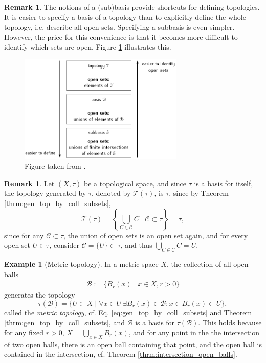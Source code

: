 \documentclass[12pt, a4paper]{article}
\numberwithin{equation}{section}
\theoremstyle{definition}
\theoremstyle{definition}
\newtheorem{exmp}[thm]{Example} %
\newtheorem{remark}[thm]{Remark} %
\begin{document}
		\begin{remark}
			The notions of a (sub)basis provide shortcuts for defining topologies. It is easier to specify a basis of a topology than to explicitly define the whole topology, i.e. describe all open sets. Specifying a subbasis is even simpler. However, the price for this convenience is that it becomes more difficult to identify which sets are open. Figure \ref{fig:topology_sub_basis} illustrates this.
			\begin{figure}[h!]
				\centering 
				\includegraphics[width=0.7\textwidth]{Figures/topoly_(sub)basis.pdf}
				\caption{Figure taken from \cite{src:topology_sub_basis}.}
				\label{fig:topology_sub_basis}
			\end{figure}
		\end{remark}
		
		\begin{remark}\label{remark:topology_generated_by_topology}
			Let $(X, \tau)$ be a topological space, and since $\tau$ is a basis for itself, the topology generated by $\tau$, denoted by $\mathscr T(\tau)$, is $\tau$, since by Theorem \ref{thrm:gen_top_by_coll_subsets},
			$$\mathscr T(\tau) = \left\{ \bigcup_{C\in\mathscr C}C \mid \mathscr C \subset \tau \right\} = \tau,$$ since for any $\mathscr C\subset\tau$, the union of open sets is an open set again, and for every open set $U\in\tau$, consider $\mathscr C = \{U\}\subset \tau$, and thus $\bigcup_{C\in\mathscr C}C = U$.
		\end{remark}
		
		\begin{exmp}[Metric topology]\label{exmp:metric_topology}
			In a metric space $X$, the collection of all open balls 
			\begin{align}\label{eq:bases_open_ball_metric_spaces}
				\mathscr B := \{ B_{r}(x) \mid x\in X, r > 0 \}
			\end{align} 
			generates the topology $$\tau(\mathscr B) = \{U\subset X\mid \forall x\in U\ \exists B_{r}(x)\in\mathscr B: x\in B_{r}(x)\subset U\},$$
			called the \textit{metric topology}, cf. Eq. \eqref{eq:gen_top_by_coll_subsets} and Theorem \ref{thrm:gen_top_by_coll_subsets}, and $\mathscr B$ is a basis for $\tau(\mathscr B)$. This holds because for any fixed $r > 0$, $X = \bigcup_{x\in X}B_{r}(x)$, and for any point in the the intersection of two open balls, there is an open ball containing that point, and the open ball is contained in the intersection, cf. Theorem \ref{thrm:intersection_open_balls}.
		\end{exmp}
		
\end{document}
